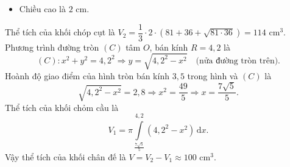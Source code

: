 \begin{ex}
{\begin{itemize}
			\item  	Chiều cao là $2$ cm.
		\end{itemize}
		Thể tích của khối chóp cụt là $V_2 = \dfrac{1}{3}\cdot 2\cdot \left(81+36+\sqrt{81\cdot 36} \right) =114$ cm$^3$.\\
		Phương trình đường tròn $(C)$ tâm $O$, bán kính $R = 4{,}2$ là
		$$(C)\colon x^2 + y^2 = 4{,}2^2 \Rightarrow y = \sqrt{4{,}2^2 - x^2} \quad \text{(nửa đường tròn trên).}$$
		Hoành độ giao điểm của hình tròn bán kính $3{,}5$ trong hình và  $(C)$ là
		$$\sqrt{4{,}2^2 - x^2} = 2{,}8 \Rightarrow x^2 =\dfrac{49}{5} \Rightarrow x = \dfrac{7\sqrt5}{5}.$$
		Thể tích của khối chỏm cầu là 
		$$V_1 = \pi\displaystyle \int\limits_{\tfrac{7\sqrt5}{5}}^{4{,}2} \left(4{,}2^2 - x^2 \right)\mathrm{\,d}x.$$
		Vậy thể tích của khối chân đế là $V= V_2 - V_1 \approx 100$ cm$^3$.
	}
\end{ex} 
